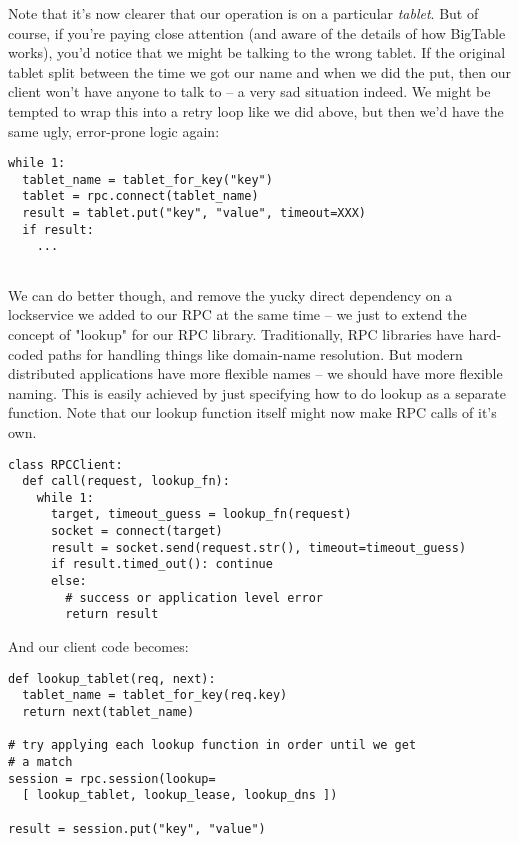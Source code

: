 \documentclass[psfig,10pt]{article}
\begin{document}
Note that it's now clearer that our operation is on a particular \emph{tablet}.
But of course, if you're paying close attention (and aware of the details of how
BigTable works), you'd notice that we might be talking to the wrong tablet.  If
the original tablet split between the time we got our name and when we did the
put, then our client won't have anyone to talk to -- a very sad situation
indeed.  We might be tempted to wrap this into a retry loop like we did above,
but then we'd have the same ugly, error-prone logic again:

\begin{lstlisting}[caption={Simple BigTable lookup, take 3.}]
while 1:
  tablet_name = tablet_for_key("key")
  tablet = rpc.connect(tablet_name)
  result = tablet.put("key", "value", timeout=XXX)
  if result:
    ...
  
\end{lstlisting}

We can do better though, and remove the yucky direct dependency on a
lockservice we added to our RPC at the same time -- we just to extend the
concept of "lookup" for our RPC library.  Traditionally, RPC libraries have
hard-coded paths for handling things like domain-name resolution.  But modern
distributed applications have more flexible names -- we should have more
flexible naming.  This is easily achieved by just specifying how to do lookup
as a separate function.  Note that our lookup function itself might now make
RPC calls of it's own.

\begin{lstlisting}[caption=Resolution integrated into RPC library.]
class RPCClient:
  def call(request, lookup_fn):
    while 1:
      target, timeout_guess = lookup_fn(request)
      socket = connect(target)
      result = socket.send(request.str(), timeout=timeout_guess)
      if result.timed_out(): continue
      else:
        # success or application level error
        return result
\end{lstlisting}

And our client code becomes:

\begin{lstlisting}[caption={Simple BigTable lookup, take 4.}]
def lookup_tablet(req, next):
  tablet_name = tablet_for_key(req.key)
  return next(tablet_name)

# try applying each lookup function in order until we get 
# a match
session = rpc.session(lookup=
  [ lookup_tablet, lookup_lease, lookup_dns ])

result = session.put("key", "value")
\end{lstlisting}
\end{document}
